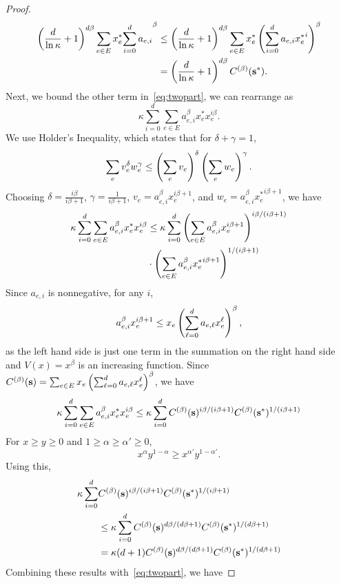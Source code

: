 \documentclass[twoside]{article}
\begin{document}
\begin{multicols}{2}
\begin{proof}
\begin{align*}
    \left(\frac{d}{\ln \kappa} + 1\right)^{d\beta} \sum_{e \in E} x_e^* {\sum_{i=0}^d
    a_{e,i}}^\beta &\le \left(\frac{d}{\ln \kappa} + 1\right)^{d\beta} \sum_{e \in E}
    x_e^* \left(\sum_{i=0}^d a_{e,i}
    {x_e^*}^i\right)^\beta \\
    &= \left(\frac{d}{\ln \kappa} + 1\right)^{d\beta} C^{(\beta)}(\mathbf{s}^*).
  \end{align*}
  Next, we bound the other term in~\eqref{eq:twopart}, we can rearrange as
  \[
    \kappa\sum_{i=0}^d \sum_{e \in E} a_{e,i}^\beta x_e^* x_e^{i\beta}.
  \]
  We use Holder's Inequality, which states that for $\delta + \gamma = 1$,
  \[
    \sum_e v_e^\delta w_e^\gamma \le \left(\sum_e v_e\right)^\delta \left(\sum_e w_e\right)^\gamma.
  \]
  Choosing $\delta = \frac{i\beta}{i\beta + 1}$, $\gamma = \frac{1}{i\beta +
  1}$, $v_e = a_{e,i}^\beta x_e^{i\beta + 1}$, and $w_e = a_{e,i}^\beta
  {x_e^*}^{i\beta + 1}$, we have
  \begin{align*}
    \kappa\sum_{i=0}^d \sum_{e \in E} a_{e,i}^\beta x_e^* x_e^{i\beta} &\le
    \kappa \sum_{i=0}^d \left(\sum_{e \in E} a_{e,i}^\beta x_e^{i\beta +
    1}\right)^{i\beta/(i\beta+1)} \\
    &\cdot \left(\sum_{e \in E} a_{e,i}^\beta {x_e^*}^{i\beta +
    1}\right)^{1/(i\beta+1)}
  \end{align*}
  Since $a_{e,i}$ is nonnegative, for any $i$,
  \[
    a_{e,i}^\beta x_e^{i\beta+1} \le x_e \left(\sum_{\ell=0}^d a_{e,\ell}
    x_e^{\ell}\right)^\beta,
  \]
  as the left hand side is just one term in the summation on the right hand
  side and $V(x) = x^\beta$ is an increasing function. Since $C^{(\beta)}(\mathbf{s}) =
  \sum_{e \in E} x_e \left(\sum_{\ell=0}^d a_{e,\ell} x_e^\ell\right)^\beta$, we have
  \begin{align*}
    \kappa\sum_{i=0}^d \sum_{e \in E} a_{e,i}^\beta x_e^* x_e^{i\beta} &\le
    \kappa \sum_{i=0}^d C^{(\beta)}(\mathbf{s})^{i\beta/(i\beta+1)}
    C^{(\beta)}(\mathbf{s}^*)^{1/(i\beta+1)} \\
  \end{align*}
  For $x \ge y \ge 0$ and $1 \ge \alpha \ge \alpha' \ge 0$,
  \[
    x^\alpha y^{1-\alpha} \ge x^{\alpha'} y^{1-\alpha'}.
  \]
  Using this,
  \begin{align*}
    \kappa\sum_{i=0}^d &C^{(\beta)}(\mathbf{s})^{i\beta/(i\beta+1)}
    C^{(\beta)}(\mathbf{s}^*)^{1/(i\beta+1)} \\
    &\le \kappa\sum_{i=0}^d C^{(\beta)}(\mathbf{s})^{d\beta/(d\beta+1)}
    C^{(\beta)}(\mathbf{s}^*)^{1/(d\beta+1)} \\
    &= \kappa(d+1)C^{(\beta)}(\mathbf{s})^{d\beta/(d\beta+1)}
    C^{(\beta)}(\mathbf{s}^*)^{1/(d\beta+1)}
  \end{align*}
  Combining these results with~\eqref{eq:twopart}, we have

\end{proof}
\end{multicols}
\end{document}
